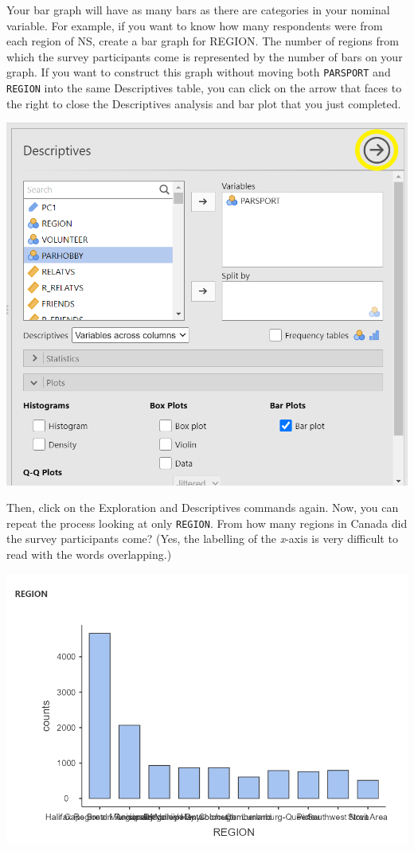 \documentclass[
]{book}
\begin{document}
Your bar graph will have as many bars as there are categories in your nominal variable. For example, if you want to know how many respondents were from each region of NS, create a bar graph for REGION. The number of regions from which the survey participants come is represented by the number of bars on your graph. If you want to construct this graph without moving both \texttt{PARSPORT} and \texttt{REGION} into the same Descriptives table, you can click on the arrow that faces to the right to close the Descriptives analysis and bar plot that you just completed.

\includegraphics{img/PARSPORTBarGraphCommitToResults.png}

Then, click on the {Exploration} and {Descriptives} commands again. Now, you can repeat the process looking at only \texttt{REGION}. From how many regions in Canada did the survey participants come? (Yes, the labelling of the \emph{x}-axis is very difficult to read with the words overlapping.)

\includegraphics{img/REGIONBarGraph_MessyXAxis.png}
\end{document}
